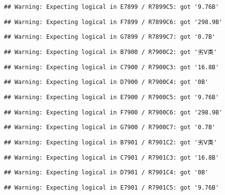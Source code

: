\documentclass[
]{article}
\begin{document}
\begin{verbatim}
## Warning: Expecting logical in E7899 / R7899C5: got '9.76B'
\end{verbatim}

\begin{verbatim}
## Warning: Expecting logical in F7899 / R7899C6: got '298.9B'
\end{verbatim}

\begin{verbatim}
## Warning: Expecting logical in G7899 / R7899C7: got '0.7B'
\end{verbatim}

\begin{verbatim}
## Warning: Expecting logical in B7900 / R7900C2: got '劣Ⅴ类'
\end{verbatim}

\begin{verbatim}
## Warning: Expecting logical in C7900 / R7900C3: got '16.8B'
\end{verbatim}

\begin{verbatim}
## Warning: Expecting logical in D7900 / R7900C4: got '0B'
\end{verbatim}

\begin{verbatim}
## Warning: Expecting logical in E7900 / R7900C5: got '9.76B'
\end{verbatim}

\begin{verbatim}
## Warning: Expecting logical in F7900 / R7900C6: got '298.9B'
\end{verbatim}

\begin{verbatim}
## Warning: Expecting logical in G7900 / R7900C7: got '0.7B'
\end{verbatim}

\begin{verbatim}
## Warning: Expecting logical in B7901 / R7901C2: got '劣Ⅴ类'
\end{verbatim}

\begin{verbatim}
## Warning: Expecting logical in C7901 / R7901C3: got '16.8B'
\end{verbatim}

\begin{verbatim}
## Warning: Expecting logical in D7901 / R7901C4: got '0B'
\end{verbatim}

\begin{verbatim}
## Warning: Expecting logical in E7901 / R7901C5: got '9.76B'
\end{verbatim}
\end{document}

